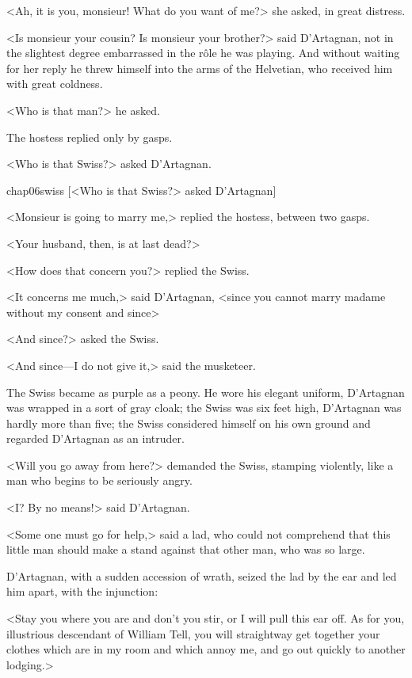 <Ah, it is you, monsieur! What do you want of me?> she asked, in great distress.

<Is monsieur your cousin? Is monsieur your brother?> said D'Artagnan, not in the slightest degree embarrassed in the rôle he was playing. And without waiting for her reply he threw himself into the arms of the Helvetian, who received him with great coldness.

<Who is that man?> he asked.

The hostess replied only by gasps.

<Who is that Swiss?> asked D'Artagnan.


\begin{colorbigpic}
	[\basicscale] 
	{chap06swiss}
	[<Who is that Swiss?> asked D'Artagnan]
\end{colorbigpic}


<Monsieur is going to marry me,> replied the hostess, between two gasps.

<Your husband, then, is at last dead?>

<How does that concern you?> replied the Swiss.

<It concerns me much,> said D'Artagnan, <since you cannot marry madame without my consent and since\longdash>

<And since?> asked the Swiss.

<And since—I do not give it,> said the musketeer.

The Swiss became as purple as a peony. He wore his elegant uniform, D'Artagnan was wrapped in a sort of gray cloak; the Swiss was six feet high, D'Artagnan was hardly more than five; the Swiss considered himself on his own ground and regarded D'Artagnan as an intruder.

<Will you go away from here?> demanded the Swiss, stamping violently, like a man who begins to be seriously angry.

<I\@? By no means!> said D'Artagnan.

<Some one must go for help,> said a lad, who could not comprehend that this little man should make a stand against that other man, who was so large.

D'Artagnan, with a sudden accession of wrath, seized the lad by the ear and led him apart, with the injunction:

<Stay you where you are and don't you stir, or I will pull this ear off. As for you, illustrious descendant of William Tell, you will straightway get together your clothes which are in my room and which annoy me, and go out quickly to another lodging.>

